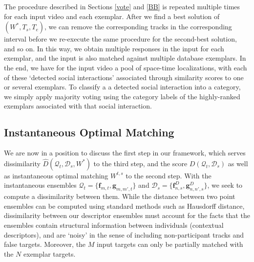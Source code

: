 \documentclass[10pt,twocolumn,letterpaper]{article}
\begin{document}
The procedure described in Sections \ref{vote} and \ref{BB} is repeated multiple times for each input video and each exemplar. After we find a best solution of $(W^{*}, T_{s}, T_{e})$, we can remove the corresponding tracks in the corresponding interval before we re-execute the same procedure for the second-best solution, and so on. In this way, we obtain multiple responses in the input for each exemplar, and  the input is also matched against multiple database exemplars. In the end, we have for the input video a pool of space-time localizations, with each of these `detected social interactions' associated through similarity scores to one or several exemplars. To classify a a detected social interaction into a category, we simply apply majority voting using the category labels of the highly-ranked exemplars associated with that social interaction.


\subsection{Instantaneous Optimal Matching}
\label{agg}

We are now in a position to discuss the first step in our framework, which serves dissimilarity $\hat{D}(\mathcal{Q}_{t}, \mathcal{D}_{s}, W^{*})$ to the third step, and the score $D(\mathcal{Q}_{t}, \mathcal{D}_{s})$ as well as instantaneous optimal matching $W^{t,s}$ to the second step. With the instantaneous ensembles $\mathcal{Q}_{t}=\{\mathbf{f}_{m,t},\mathbf{g}_{m,m',t}\}$ and $\mathcal{D}_{s}=\{\mathbf{f}^{D}_{n,s},\mathbf{g}^{D}_{n,n',s}\}$, we seek to compute a dissimilarity between them. While the distance between two point ensembles can be computed using standard methods such as Hausdorff distance, dissimilarity between our descriptor ensembles must account for the facts that the ensembles contain structural information between individuals (contextual descriptors), and are `noisy' in the sense of including non-participant tracks and false targets. Moreover, the $M$ input targets can only be partially matched with the $N$ exemplar targets. 
\end{document}
